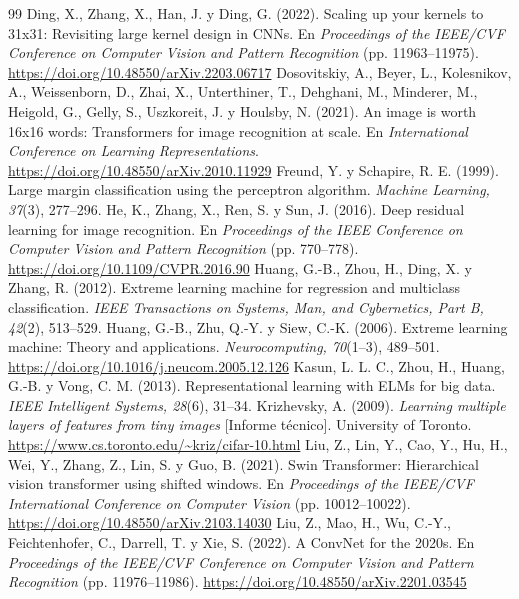 \documentclass[11pt,a4paper]{article}
\begin{document}
\renewcommand{\refname}{Referencias}
\begin{thebibliography}{99}\small
\setlength{\itemindent}{-1.5em}\setlength{\leftmargin}{1.5em}\setlength{\itemsep}{2pt}
 Ding, X., Zhang, X., Han, J. y Ding, G. (2022). Scaling up your kernels to 31x31: Revisiting large kernel design in CNNs. En \emph{Proceedings of the IEEE/CVF Conference on Computer Vision and Pattern Recognition} (pp. 11963--11975). \url{https://doi.org/10.48550/arXiv.2203.06717}
 Dosovitskiy, A., Beyer, L., Kolesnikov, A., Weissenborn, D., Zhai, X., Unterthiner, T., Dehghani, M., Minderer, M., Heigold, G., Gelly, S., Uszkoreit, J. y Houlsby, N. (2021). An image is worth 16x16 words: Transformers for image recognition at scale. En \emph{International Conference on Learning Representations}. \url{https://doi.org/10.48550/arXiv.2010.11929}
 Freund, Y. y Schapire, R. E. (1999). Large margin classification using the perceptron algorithm. \emph{Machine Learning, 37}(3), 277--296.
 He, K., Zhang, X., Ren, S. y Sun, J. (2016). Deep residual learning for image recognition. En \emph{Proceedings of the IEEE Conference on Computer Vision and Pattern Recognition} (pp. 770--778). \url{https://doi.org/10.1109/CVPR.2016.90}
 Huang, G.-B., Zhou, H., Ding, X. y Zhang, R. (2012). Extreme learning machine for regression and multiclass classification. \emph{IEEE Transactions on Systems, Man, and Cybernetics, Part B, 42}(2), 513--529.
 Huang, G.-B., Zhu, Q.-Y. y Siew, C.-K. (2006). Extreme learning machine: Theory and applications. \emph{Neurocomputing, 70}(1--3), 489--501. \url{https://doi.org/10.1016/j.neucom.2005.12.126}
 Kasun, L. L. C., Zhou, H., Huang, G.-B. y Vong, C. M. (2013). Representational learning with ELMs for big data. \emph{IEEE Intelligent Systems, 28}(6), 31--34.
 Krizhevsky, A. (2009). \emph{Learning multiple layers of features from tiny images} [Informe técnico]. University of Toronto. \url{https://www.cs.toronto.edu/~kriz/cifar-10.html}
 Liu, Z., Lin, Y., Cao, Y., Hu, H., Wei, Y., Zhang, Z., Lin, S. y Guo, B. (2021). Swin Transformer: Hierarchical vision transformer using shifted windows. En \emph{Proceedings of the IEEE/CVF International Conference on Computer Vision} (pp. 10012--10022). \url{https://doi.org/10.48550/arXiv.2103.14030}
 Liu, Z., Mao, H., Wu, C.-Y., Feichtenhofer, C., Darrell, T. y Xie, S. (2022). A ConvNet for the 2020s. En \emph{Proceedings of the IEEE/CVF Conference on Computer Vision and Pattern Recognition} (pp. 11976--11986). \url{https://doi.org/10.48550/arXiv.2201.03545}

\end{thebibliography}
\end{document}
